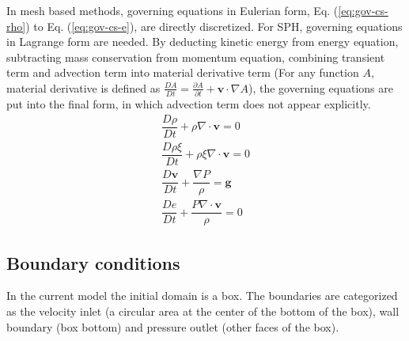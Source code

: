 \documentclass[gmd, manuscript]{copernicus}
\begin{document}
In mesh based methods, governing equations in Eulerian form, Eq. (\ref{eq:gov-cs-rho}) to Eq. (\ref{eq:gov-cs-e}), are directly discretized. For SPH, governing equations in Lagrange form are needed. By deducting kinetic energy from energy equation, subtracting mass conservation from momentum equation, combining transient term and advection term into material derivative term (For any function $A$, material derivative is defined as $\frac{D A}{Dt} = \frac{\partial A}{\partial t} + \textbf{v} \cdot \nabla A$), the governing equations are put into the final form, in which advection term does not appear explicitly.
\begin{align}
\dfrac{D \rho}{D t} + \rho \nabla \cdot \textbf{v} = 0 \label{eq:gov-nc-rho}\\
\dfrac{D \rho \xi}{D t} + \rho \xi \nabla \cdot \textbf{v} = 0 \label{eq:gov-nc-ks}\\
\dfrac{D \textbf{v}}{D t} + \dfrac{\nabla P}{\rho} =\textbf{g} \label{eq:gov-nc-v}\\
\dfrac{D e}{D t} + \dfrac{P \nabla \cdot \textbf{v}}{\rho} = 0 \label{eq:gov-nc-e}
\end{align}

\subsection{Boundary conditions}
In the current model the initial domain is a box. The boundaries are categorized as the velocity inlet (a circular area at the center of the bottom of the box), wall boundary (box bottom) and pressure outlet (other faces of the box).
\end{document}
